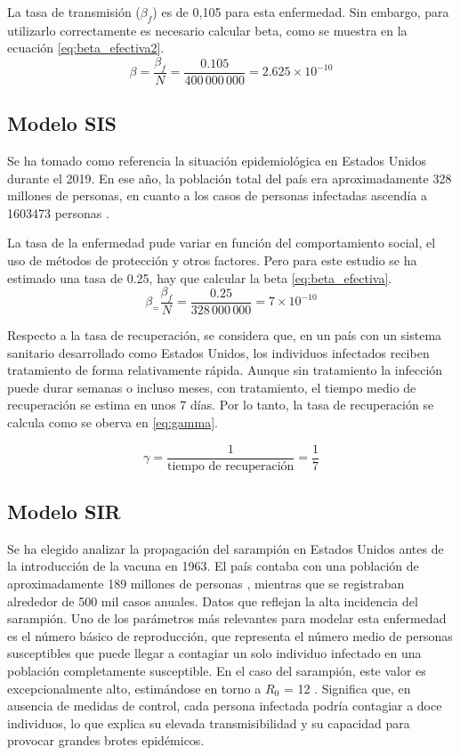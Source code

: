 La tasa de transmisión ($\beta_f$) es de 0,105 \cite{shakiba2021epidemiological} para esta enfermedad. Sin embargo, para utilizarlo correctamente es necesario calcular beta,  como se muestra en la ecuación \eqref{eq:beta_efectiva2}.
\begin{equation}
\beta = \frac{\beta_f}{N} = \frac{0.105}{400\,000\,000} = 2.625 \times 10^{-10}
\label{eq:beta_efectiva2}
\end{equation}

\subsection{Modelo SIS}
Se ha tomado como referencia la situación epidemiológica en Estados Unidos durante el 2019. En ese año, la población total del país era aproximadamente 328 millones de personas, en cuanto a los casos de personas infectadas ascendía a 1603473 personas \cite{pollock2023estimated}.

La tasa de la enfermedad pude variar en función del comportamiento social, el uso de métodos de protección y otros factores. Pero para este estudio se ha estimado una tasa de 0.25, hay que calcular la beta \eqref{eq:beta_efectiva}.
\begin{equation}
\beta_ = \frac{\beta_f}{N} = \frac{0.25}{328\,000\,000} = 7 \times 10^{-10}
\label{eq:beta_efectiva}
\end{equation}


Respecto a la tasa de recuperación, se considera que, en un país con un sistema sanitario desarrollado como Estados Unidos, los individuos infectados reciben tratamiento de forma relativamente rápida. Aunque sin tratamiento la infección puede durar semanas o incluso meses, con tratamiento, el tiempo medio de recuperación se estima en unos 7 días. Por lo tanto, la tasa de recuperación se calcula como se oberva en \eqref{eq:gamma}.

\begin{equation}
\gamma = \frac{1}{\text{tiempo de recuperación}} = \frac{1}{7}
\label{eq:gamma}
\end{equation}


\subsection{Modelo SIR}
Se ha elegido analizar la propagación del sarampión en Estados Unidos antes de la introducción de la vacuna en 1963. El país contaba con una población de aproximadamente 189 millones de personas \cite{datosmacro_usa_1963}, mientras que se registraban alrededor de 500 mil casos anuales. Datos que reflejan la alta incidencia del sarampión.
Uno de los parámetros más relevantes para modelar esta enfermedad es el número básico de reproducción, que representa el número medio de personas susceptibles que puede llegar a contagiar un solo individuo infectado en una población completamente susceptible. En el caso del sarampión, este valor es excepcionalmente alto, estimándose en torno a $R_0$ = 12 \cite{solomon2019peter}. Significa que, en ausencia de medidas de control, cada persona infectada podría contagiar a doce individuos, lo que explica su elevada transmisibilidad y su capacidad para provocar grandes brotes epidémicos.

